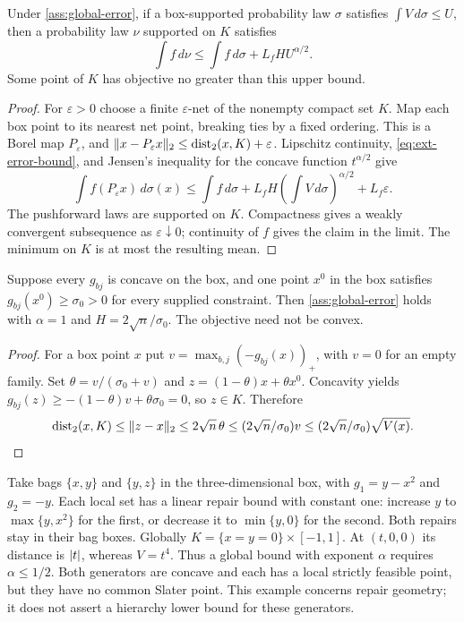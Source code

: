 \begin{lemma}\label{lem:global-repair}
Under \cref{ass:global-error}, if a box-supported probability law $\sigma$
satisfies $\int V\,d\sigma\le U$, then a probability law $\nu$ supported on
$K$ satisfies
\[
 \int f\,d\nu\le\int f\,d\sigma+L_fH U^{\alpha/2}.
\]
Some point of $K$ has objective no greater than this upper bound.
\end{lemma}
\begin{proof}
For $\varepsilon>0$ choose a finite $\varepsilon$-net of the nonempty
compact set $K$. Map each box point to its nearest net point, breaking ties
by a fixed ordering. This is a Borel map $P_\varepsilon$, and
$\lVert x-P_\varepsilon x\rVert_2\le\operatorname{dist}_2(x,K)+\varepsilon$.
Lipschitz continuity, \eqref{eq:ext-error-bound}, and Jensen's inequality
for the concave function $t^{\alpha/2}$ give
\[
 \int f(P_\varepsilon x)\,d\sigma(x)
 \le\int f\,d\sigma+L_fH(\int V\,d\sigma)^{\alpha/2}+L_f\varepsilon.
\]
The pushforward laws are supported on $K$. Compactness gives a weakly
convergent subsequence as $\varepsilon\downarrow0$; continuity of $f$ gives
the claim in the limit. The minimum on $K$ is at most the resulting mean.
\end{proof}

\begin{proposition}\label{prop:convex-slater}
Suppose every $g_{bj}$ is concave on the box, and one point $x^0$ in the
box satisfies $g_{bj}(x^0)\ge\sigma_0>0$ for every supplied constraint.
Then \cref{ass:global-error} holds with $\alpha=1$ and
$H=2\sqrt n/\sigma_0$. The objective need not be convex.
\end{proposition}
\begin{proof}
For a box point $x$ put $v=\max_{b,j}(-g_{bj}(x))_+$, with $v=0$ for an
empty family. Set $\theta=v/(\sigma_0+v)$ and
$z=(1-\theta)x+\theta x^0$. Concavity yields
$g_{bj}(z)\ge-(1-\theta)v+\theta\sigma_0=0$, so $z\in K$. Therefore
\[
 \operatorname{dist}_2(x,K)\le\lVert z-x\rVert_2\le2\sqrt n\,\theta
 \le(2\sqrt n/\sigma_0)v\le(2\sqrt n/\sigma_0)\sqrt{V(x)}.
\]
\end{proof}

\begin{example}\label{ex:global-local}
Take bags $\{x,y\}$ and $\{y,z\}$ in the three-dimensional box, with
$g_1=y-x^2$ and $g_2=-y$. Each local set has a linear repair bound with
constant one: increase $y$ to $\max\{y,x^2\}$ for the first, or decrease it
to $\min\{y,0\}$ for the second. Both repairs stay in their bag boxes.
Globally $K=\{x=y=0\}\times[-1,1]$. At $(t,0,0)$ its distance is
$\lvert t\rvert$, whereas $V=t^4$. Thus a global bound with exponent $\alpha$
requires $\alpha\le1/2$. Both generators are concave and each has a local
strictly feasible point, but they have no common Slater point. This
example concerns repair geometry; it does not assert a hierarchy lower
bound for these generators.
\end{example}

